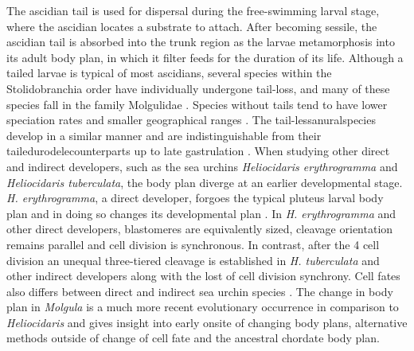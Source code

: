 The ascidian tail is used for dispersal during the free-swimming larval stage, where the ascidian locates a substrate to attach. After becoming sessile, the ascidian tail is absorbed into the trunk region as the larvae metamorphosis into its adult body plan, in which it filter feeds for the duration of its life. Although a tailed larvae is typical of most ascidians, several species within the Stolidobranchia order have individually undergone tail-loss, and many of these species fall in the family Molgulidae \cite{berrill_studies_1931, jeffery_evolution_1999, huber_evolution_2000, maliska_molgula_2010}. Species without tails tend to have lower speciation rates and smaller geographical ranges \cite{maliska_developmental_2013}. The tail-less\textemdash anural\textemdash species develop in a similar manner and are indistinguishable from their tailed\textemdash urodele\textemdash counterparts up to late gastrulation \cite{berrill_studies_1931, swalla_interspecific_1990, jeffery_factors_1992}. When studying other direct and indirect developers, such as the sea urchins \textit{Heliocidaris erythrogramma} and  \textit{Heliocidaris tuberculata}, the body plan diverge at an earlier developmental stage. \textit{H. erythrogramma}, a direct developer, forgoes the typical pluteus larval body plan and in doing so changes its developmental plan \cite{henry_evolutionary_1990}. In \textit{H. erythrogramma} and other direct developers, blastomeres are equivalently sized, cleavage orientation remains parallel and cell division is synchronous. In contrast, after the 4 cell division an unequal three-tiered cleavage is established in \textit{H. tuberculata} and other indirect developers along with the lost of cell division synchrony. Cell fates also differs between direct and indirect sea urchin species \cite{wray_evolutionary_1989}. The change in body plan in \textit{Molgula} is a much more recent evolutionary occurrence in comparison to \textit{Heliocidaris} and %
gives insight into early onsite of changing body plans, alternative methods outside of change of cell fate and the ancestral chordate body plan.  

